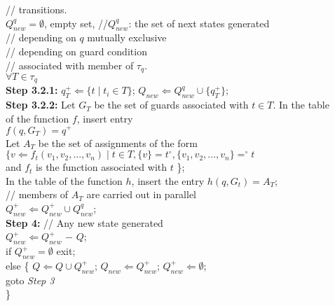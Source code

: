 \documentclass[9pt,executive]{article}
\begin{document}
\hspace*{2.84in} // transitions.\\
\hspace*{0.81in}$Q_{new}^q = \emptyset$, empty set, //$Q_{new}^q$: the set of next states generated \\
\hspace*{2.01in} // depending on $q$ mutually exclusive\\
\hspace*{2.01in} // depending on guard condition\\ 
\hspace*{2.01in} // associated with member of $\tau _q$.\\  
\hspace*{0.25in}{\bf Step 3.2:} $\forall T \in \tau _q$\\ 
\hspace*{0.35in} {\bf Step 3.2.1:} $q_T^{+} \Leftarrow \{t \mid t_i \in T\}$; $Q_{new} \Leftarrow  Q_{new}^q \cup \{q_T^{+}\}$;\\             
\hspace*{0.35in} {\bf Step 3.2.2:} Let $G_T$ be the set of guards associated with $t \in T$. In the table\\
\hspace*{1.04in} of the function $f$, insert entry\\
\hspace*{1.04in} $f(q, G_T) = q^+$\\
\hspace*{0.35in}{\bf Step 3.2.3:} Let $A_T$ be the set of assignments of the form\\
\hspace*{1.06in}$\{v \Leftarrow f_t(v_1, v_2, ..., v_n) \mid t \in T, \{v\} = t ^\circ, \{v_1, v_2, ..., v_n\} = ^\circ{t}$\\
\hspace*{2.36in} and $f_t$ is the function associated with $t$ \}; \\
\hspace*{1.06in} In the table of the function $h$, insert the entry $h(q, G_t) = A_T$;\\ 
\hspace*{1.06in} // members of $A_T$ are carried out in parallel\\ 
\hspace*{0.35in}{\bf Step 3.2.4:} $Q_{new}^+ \Leftarrow Q_{new}^+ \cup  Q_{new}^q$; \\        
{\bf Step 4:} // Any new state generated \\
\hspace*{0.42in} $Q_{new}^+ \Leftarrow Q_{new}^+$ $-$ $Q$;\\
\hspace*{0.42in} if $Q_{new}^+ = \emptyset$  exit;\\
\hspace*{0.48in} else \{ $Q \Leftarrow Q \cup Q_{new}^+$; $Q_{new} \Leftarrow Q_{new}^+$; $Q_{new}^+ \Leftarrow \emptyset$;\\
\hspace*{0.83in} goto {\it Step 3}\\
\hspace*{0.75in} \}\\
\end{document}
